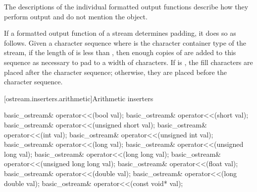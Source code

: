 \pnum
The descriptions of the individual formatted output functions
describe how they perform
output and do not mention the
object.

\pnum
If a formatted output function of a stream  determines
padding, it does so as
follows. Given a  character sequence  where
 is the character container type of the stream, if
the length of  is less than , then enough copies of
 are added to this sequence as necessary to pad to a
width of  characters. If
 is
, the fill characters are placed
after the character sequence; otherwise, they are placed before the
character sequence.

[ostream.inserters.arithmetic]{Arithmetic inserters}

%
\begin{itemdecl}
basic_ostream& operator<<(bool val);
basic_ostream& operator<<(short val);
basic_ostream& operator<<(unsigned short val);
basic_ostream& operator<<(int val);
basic_ostream& operator<<(unsigned int val);
basic_ostream& operator<<(long val);
basic_ostream& operator<<(unsigned long val);
basic_ostream& operator<<(long long val);
basic_ostream& operator<<(unsigned long long val);
basic_ostream& operator<<(float val);
basic_ostream& operator<<(double val);
basic_ostream& operator<<(long double val);
basic_ostream& operator<<(const void* val);
\end{itemdecl}

